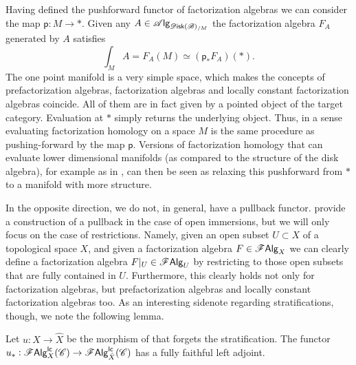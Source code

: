 \documentclass[../text]{subfiles}
\begin{document}
\begin{remark}\label{rem:fh_is_pushingforward}
    Having defined the pushforward functor of factorization algebras we can consider the map $\mathsf{p}:M \rightarrow *$. Given any $A \in \alg{\disk(\bstr)_{/M}}$ the factorization algebra $F_A$ generated by $A$ satisfies
    \begin{equation}
        \int_M A  = F_A(M) \simeq (\mathsf{p}_* F_A)(*).
    \end{equation}
    The one point manifold is a very simple space, which makes the concepts of prefactorization algebras, factorization algebras and locally constant factorization algebras coincide. All of them are in fact given by a pointed object of the target category. Evaluation at $*$ simply returns the underlying object. Thus, in a sense evaluating factorization homology on a space $M$ is the same procedure as pushing-forward by the map $\mathsf{p}$. Versions of factorization homology that can evaluate lower dimensional manifolds (as compared to the structure of the disk algebra), for example as in \cite[cor.2.29]{aft_fhstrat}, can then be seen as relaxing this pushforward from $*$ to a manifold with more structure.
\end{remark} 

In the opposite direction, we do not, in general, have a pullback functor. \cite{cg2016} provide a construction of a pullback in the case of open immersions, but we will only focus on the case of restrictions. Namely, given an open subset $U \subset X$ of a topological space $X$, and given a factorization algebra $F \in \mathscr{F} \mathsf{Alg}_X$ we can clearly define a factorization algebra $F|_{U} \in \mathscr{F} \mathsf{Alg}_U$ by restricting to those open subsets that are fully contained in $U$. Furthermore, this clearly holds not only for factorization algebras, but prefactorization algebras and locally constant factorization algebras too. As an interesting sidenote regarding stratifications, though, we note the following lemma.

\begin{lemma}\label{lem:ff_functor_to_refinement}
    Let $u: X \rightarrow \hat{X}$ be the morphism of  that forgets the stratification. The functor $u_*: \mathscr{F} \mathsf{Alg}^{\mathsf{lc}}_{X} (\mathscr{C}) \rightarrow \mathscr{F} \mathsf{Alg}^{\mathsf{lc}}_{\hat{X}} (\mathscr{C})$ has a fully faithful left adjoint.
\end{lemma}
\end{document}
